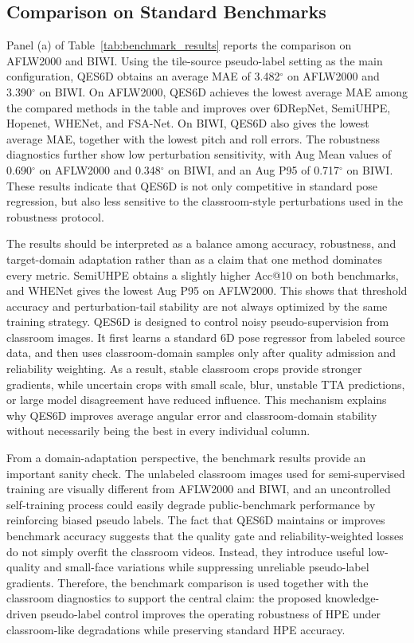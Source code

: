 \documentclass[preprint,12pt]{elsarticle}
\begin{document}
\subsection{Comparison on Standard Benchmarks}
\label{subsec:benchmark_comparison}

Panel (a) of Table~\ref{tab:benchmark_results} reports the comparison on AFLW2000 and BIWI. Using the tile-source pseudo-label setting as the main configuration, QES6D obtains an average MAE of 3.482$^\circ$ on AFLW2000 and 3.390$^\circ$ on BIWI. On AFLW2000, QES6D achieves the lowest average MAE among the compared methods in the table and improves over 6DRepNet, SemiUHPE, Hopenet, WHENet, and FSA-Net. On BIWI, QES6D also gives the lowest average MAE, together with the lowest pitch and roll errors. The robustness diagnostics further show low perturbation sensitivity, with Aug Mean values of 0.690$^\circ$ on AFLW2000 and 0.348$^\circ$ on BIWI, and an Aug P95 of 0.717$^\circ$ on BIWI. These results indicate that QES6D is not only competitive in standard pose regression, but also less sensitive to the classroom-style perturbations used in the robustness protocol.

The results should be interpreted as a balance among accuracy, robustness, and target-domain adaptation rather than as a claim that one method dominates every metric. SemiUHPE obtains a slightly higher Acc@10 on both benchmarks, and WHENet gives the lowest Aug P95 on AFLW2000. This shows that threshold accuracy and perturbation-tail stability are not always optimized by the same training strategy. QES6D is designed to control noisy pseudo-supervision from classroom images. It first learns a standard 6D pose regressor from labeled source data, and then uses classroom-domain samples only after quality admission and reliability weighting. As a result, stable classroom crops provide stronger gradients, while uncertain crops with small scale, blur, unstable TTA predictions, or large model disagreement have reduced influence. This mechanism explains why QES6D improves average angular error and classroom-domain stability without necessarily being the best in every individual column.

From a domain-adaptation perspective, the benchmark results provide an important sanity check. The unlabeled classroom images used for semi-supervised training are visually different from AFLW2000 and BIWI, and an uncontrolled self-training process could easily degrade public-benchmark performance by reinforcing biased pseudo labels. The fact that QES6D maintains or improves benchmark accuracy suggests that the quality gate and reliability-weighted losses do not simply overfit the classroom videos. Instead, they introduce useful low-quality and small-face variations while suppressing unreliable pseudo-label gradients. Therefore, the benchmark comparison is used together with the classroom diagnostics to support the central claim: the proposed knowledge-driven pseudo-label control improves the operating robustness of HPE under classroom-like degradations while preserving standard HPE accuracy.
\end{document}
